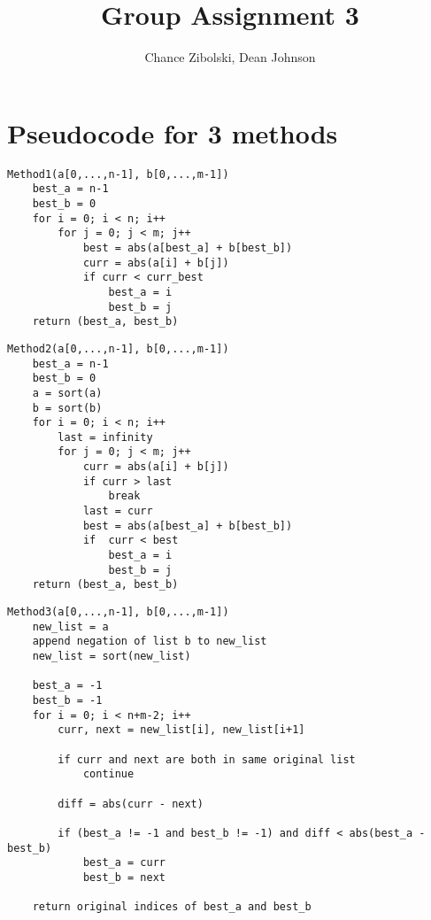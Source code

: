 \documentclass{article}
\title{Group Assignment 3}
\author{Chance Zibolski, Dean Johnson}
\begin{document}
\maketitle

\section{Pseudocode for 3 methods}
\begin{verbatim}
Method1(a[0,...,n-1], b[0,...,m-1])
    best_a = n-1
    best_b = 0
    for i = 0; i < n; i++
        for j = 0; j < m; j++
            best = abs(a[best_a] + b[best_b])
            curr = abs(a[i] + b[j])
            if curr < curr_best
                best_a = i
                best_b = j
    return (best_a, best_b)
\end{verbatim}

\begin{verbatim}
Method2(a[0,...,n-1], b[0,...,m-1])
    best_a = n-1
    best_b = 0
    a = sort(a)
    b = sort(b)
    for i = 0; i < n; i++
        last = infinity
        for j = 0; j < m; j++
            curr = abs(a[i] + b[j])
            if curr > last
                break
            last = curr
            best = abs(a[best_a] + b[best_b])
            if  curr < best
                best_a = i
                best_b = j
    return (best_a, best_b)
\end{verbatim}

\begin{verbatim}
Method3(a[0,...,n-1], b[0,...,m-1])
    new_list = a
    append negation of list b to new_list
    new_list = sort(new_list)

    best_a = -1
    best_b = -1
    for i = 0; i < n+m-2; i++
        curr, next = new_list[i], new_list[i+1]

        if curr and next are both in same original list
            continue

        diff = abs(curr - next)

        if (best_a != -1 and best_b != -1) and diff < abs(best_a - best_b)
            best_a = curr
            best_b = next

    return original indices of best_a and best_b
\end{verbatim}
\end{document}
